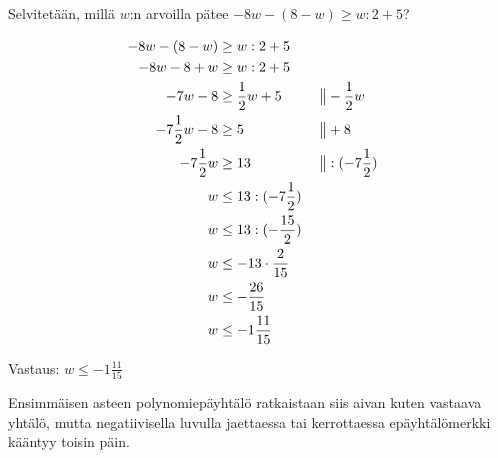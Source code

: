 \begin{esimerkki}Selvitetään, millä $w$:n arvoilla pätee $-8w-(8-w)\geq w:2+5$?

\begin{align*}
-8w-(8-w)&\geq w:2+5 \\
-8w-8+w&\geq w:2+5 \\
-7w-8&\geq \frac12 w+5  \ \ \ \ \ &&\big\| -\frac12 w \\
-7\frac12 w-8&\geq 5  \ \ \ \ \ &&\big\| +8 \\
-7\frac12 w&\geq 13  \ \ \ \ \ &&\big\| :(-7\frac12) \\
w&\leq 13:(-7\frac12) \\
w&\leq 13:(-\frac{15}{2}) \\
w&\leq -13\cdot \frac{2}{15} \\
w&\leq -\frac{26}{15} \\
w&\leq -1\frac{11}{15}
\end{align*}

Vastaus: $w\leq -1\frac{11}{15}$
\end{esimerkki}

Ensimmäisen asteen polynomiepäyhtälö ratkaistaan siis aivan kuten vastaava yhtälö, mutta negatiivisella luvulla jaettaessa tai kerrottaessa epäyhtälömerkki kääntyy toisin päin.

